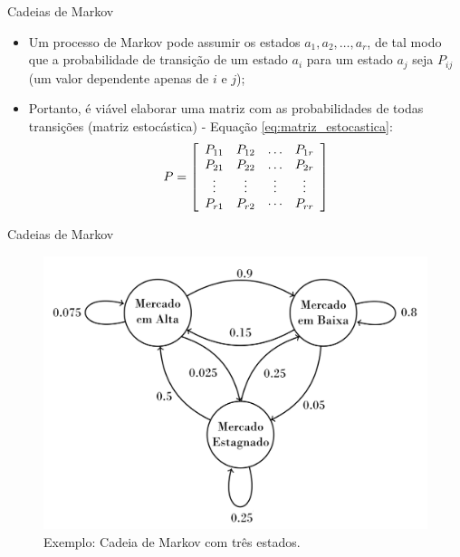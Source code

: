 \documentclass[10pt]{beamer}
\begin{document}
\begin{frame}{Cadeias de Markov}
    \begin{itemize}
        \item<1 -> Um processo de Markov pode assumir os estados $a_1, a_2, \ldots, a_r$, de tal modo que a probabilidade de transição de um estado $a_i$ para um estado $a_j$ seja $P_{ij}$ (um valor dependente apenas de $i$ e $j$);
        \item<1 -> Portanto, é viável elaborar uma matriz com as probabilidades de todas transições (matriz estocástica) - Equação \ref{eq:matriz_estocastica}:
        \begin{equation}
            \label{eq:matriz_estocastica}
            P = \left[ \begin{array} { c c c c } { P _ { 11 } } & { P _ { 12 } } & { \dots } & { P _ { 1 r } } \\ { P _ { 21 } } & { P _ { 22 } } & { \dots } & { P _ { 2 r } } \\ { \vdots } & { \vdots } & { \vdots } & { \vdots } \\ { P _ { r 1 } } & { P _ { r 2 } } & { \cdots } & { P _ { r r } } \end{array} \right]
        \end{equation}
      \end{itemize}
\end{frame}

\begin{frame}{Cadeias de Markov}
    \begin{figure}[H]
        \begin{center}
            \includegraphics[scale=0.23]{imagens/markov_chain_wikipedia.png}
            \caption{Exemplo: Cadeia de Markov com três estados.}
            \label{fig:cadeia_markov_tres_estados}
        \end{center}
    \end{figure}
\end{frame}
\end{document}
